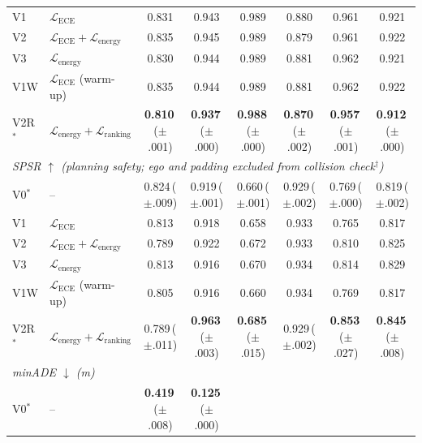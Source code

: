 \documentclass[journal]{IEEEtran}
\begin{document}
\begin{table}[t]
\begin{tabular}{l l c c c c c c}
V1   & $\mathcal{L}_\text{ECE}$
  & 0.831 & 0.943 & 0.989 & 0.880 & 0.961 & 0.921 \\
V2   & $\mathcal{L}_\text{ECE}{+}\mathcal{L}_\text{energy}$
  & 0.835 & 0.945 & 0.989 & 0.879 & 0.961 & 0.922 \\
V3   & $\mathcal{L}_\text{energy}$
  & 0.830 & 0.944 & 0.989 & 0.881 & 0.962 & 0.921 \\
V1W  & $\mathcal{L}_\text{ECE}$ (warm-up)
  & 0.835 & 0.944 & 0.989 & 0.881 & 0.962 & 0.922 \\
V2R$^*$ & $\mathcal{L}_\text{energy}{+}\mathcal{L}_\text{ranking}$
  & \textbf{0.810}\,\scriptsize{({\tiny$\pm$.001})}
  & \textbf{0.937}\,\scriptsize{({\tiny$\pm$.000})}
  & \textbf{0.988}\,\scriptsize{({\tiny$\pm$.000})}
  & \textbf{0.870}\,\scriptsize{({\tiny$\pm$.002})}
  & \textbf{0.957}\,\scriptsize{({\tiny$\pm$.001})}
  & \textbf{0.912}\,\scriptsize{({\tiny$\pm$.000})} \\
\midrule
\multicolumn{8}{l}{\textit{SPSR $\uparrow$ \quad
  (\emph{planning safety; ego and padding excluded from
   collision check$^\dagger$})}} \\[1pt]
V0$^*$  & --
  & 0.824\,\scriptsize{({\tiny$\pm$.009})}
  & 0.919\,\scriptsize{({\tiny$\pm$.001})}
  & 0.660\,\scriptsize{({\tiny$\pm$.001})}
  & 0.929\,\scriptsize{({\tiny$\pm$.002})}
  & 0.769\,\scriptsize{({\tiny$\pm$.000})}
  & 0.819\,\scriptsize{({\tiny$\pm$.002})} \\
V1   & $\mathcal{L}_\text{ECE}$
  & 0.813 & 0.918 & 0.658 & 0.933 & 0.765 & 0.817 \\
V2   & $\mathcal{L}_\text{ECE}{+}\mathcal{L}_\text{energy}$
  & 0.789 & 0.922 & 0.672 & 0.933 & 0.810 & 0.825 \\
V3   & $\mathcal{L}_\text{energy}$
  & 0.813 & 0.916 & 0.670 & 0.934 & 0.814 & 0.829 \\
V1W  & $\mathcal{L}_\text{ECE}$ (warm-up)
  & 0.805 & 0.916 & 0.660 & 0.934 & 0.769 & 0.817 \\
V2R$^*$ & $\mathcal{L}_\text{energy}{+}\mathcal{L}_\text{ranking}$
  & 0.789\,\scriptsize{({\tiny$\pm$.011})}
  & \textbf{0.963}\,\scriptsize{({\tiny$\pm$.003})}
  & \textbf{0.685}\,\scriptsize{({\tiny$\pm$.015})}
  & 0.929\,\scriptsize{({\tiny$\pm$.002})}
  & \textbf{0.853}\,\scriptsize{({\tiny$\pm$.027})}
  & \textbf{0.845}\,\scriptsize{({\tiny$\pm$.008})} \\
\midrule
\multicolumn{8}{l}{\textit{minADE $\downarrow$ (m)}} \\[1pt]
V0$^*$  & --
  & \textbf{0.419}\,\scriptsize{({\tiny$\pm$.008})}
  & \textbf{0.125}\,\scriptsize{({\tiny$\pm$.000})}

\end{tabular}
\end{table}
\end{document}
